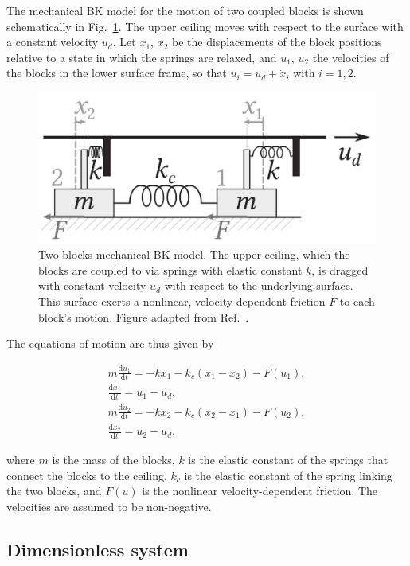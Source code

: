 The mechanical BK model for the motion of two coupled blocks is shown schematically in
Fig.~\ref{fig: 2 blocks motion}. The upper ceiling moves with respect to the surface with
a constant velocity $u_d$. Let $x_1$, $x_2$ be the displacements of the block positions
relative to a state in which the springs are relaxed, and $u_1$, $u_2$ the velocities of the blocks in the
lower surface frame, so that $u_i=u_d+\dot{x}_i$ with $i=1,2$.

\begin{figure}[!htbp]
    \centering
    \includegraphics[width=0.5\linewidth]{images/bk_2_blocks.png}
    \caption{Two-blocks mechanical BK model. The upper ceiling, which the blocks
    are coupled to via springs with elastic constant $k$, is dragged with constant
    velocity $u_d$ with respect to the underlying surface. This surface exerts a nonlinear,
    velocity-dependent friction $F$ to each block's motion. Figure adapted from Ref.~\cite{ref:electronic_analog}.
    }\label{fig: 2 blocks motion}
\end{figure}

The equations of motion are thus given by

\begin{equation}
\label{eq: 2 block motion}
    \begin{gathered}
    m\frac{\text{d}u_1}{\text{d}t} = -kx_1 - k_c(x_1-x_2) - F(u_1),\\[10pt]
    \frac{\text{d}x_1}{\text{d}t} = u_1 - u_d,\\[10pt]
    m\frac{\text{d}u_2}{\text{d}t} = -kx_2 - k_c(x_2-x_1) - F(u_2),\\[10pt]
    \frac{\text{d}x_2}{\text{d}t} = u_2 - u_d,
\end{gathered}
\end{equation}

where $m$ is the mass of the blocks, $k$ is the elastic constant of the springs that connect the blocks
to the ceiling, $k_c$ is the elastic constant of the spring linking the two blocks, and $F(u)$ is the nonlinear
velocity-dependent friction. The velocities are assumed to be non-negative.

\subsection{Dimensionless system}\label{subsec: dimensionless 2 block motion}

